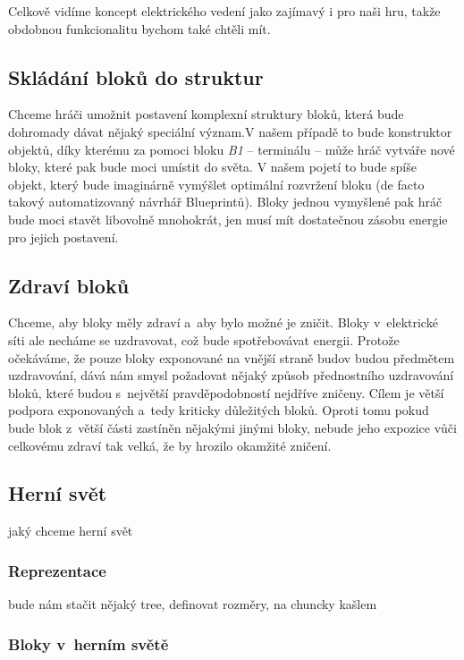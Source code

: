 Celkově vidíme koncept elektrického vedení jako zajímavý i pro naši hru, takže obdobnou funkcionalitu bychom také chtěli mít.

\subsection{Skládání bloků do struktur}

Chceme hráči umožnit postavení komplexní struktury bloků, která bude dohromady dávat nějaký speciální význam.V našem případě to bude konstruktor objektů, díky kterému za pomoci bloku \textit{B1} -- terminálu -- může hráč vytváře nové bloky, které pak bude moci umístit do světa. V našem pojetí to bude spíše objekt, který bude imaginárně vymýšlet optimální rozvržení bloku (de facto takový automatizovaný návrhář Blueprintů). Bloky jednou vymyšlené pak hráč bude moci stavět libovolně mnohokrát, jen musí mít dostatečnou zásobu energie pro jejich postavení.

\subsection{Zdraví bloků}
Chceme, aby bloky měly zdraví a~aby bylo možné je zničit. Bloky v~elektrické síti ale necháme se uzdravovat, což bude spotřebovávat energii. Protože očekáváme, že pouze bloky exponované na vnější straně budov budou předmětem uzdravování, dává nám smysl požadovat nějaký způsob přednostního uzdravování bloků, které budou s~největší pravděpodobností nejdříve zničeny. Cílem je větší podpora exponovaných a~tedy kriticky důležitých bloků. Oproti tomu pokud bude blok z~větší části zastíněn nějakými jinými bloky, nebude jeho expozice vůči celkovému zdraví tak velká, že by hrozilo okamžité zničení.

\subsection{Herní svět}

jaký chceme herní svět

\subsubsection{Reprezentace}

bude nám stačit nějaký tree, definovat rozměry, na chuncky kašlem

\subsubsection{Bloky v~herním světě}

